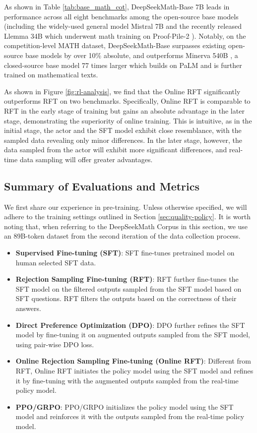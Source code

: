 As shown in Table \ref{tab:base_math_cot}, DeepSeekMath-Base 7B leads in performance across all eight benchmarks among the open-source base models (including the widely-used general model Mistral 7B \citep{mistral} and the recently released Llemma 34B \citep{llemma} which underwent math training on Proof-Pile-2 \citep{llemma}). Notably, on the competition-level MATH dataset, DeepSeekMath-Base surpasses existing open-source base models by over 10\% absolute, and outperforms Minerva 540B \citep{minerva}, a closed-source base model 77 times larger which builds on PaLM \citep{palm} and is further trained on mathematical texts.

As shown in Figure \ref{fig:rl-analysis},
we find that the Online RFT significantly outperforms RFT on two benchmarks. Specifically, Online RFT is comparable to RFT in the early stage of training but gains an absolute advantage in the later stage, demonstrating the superiority of online training. This is intuitive, as in the initial stage, the actor and the SFT model exhibit close resemblance, with the sampled data revealing only minor differences. In the later stage, however, the data sampled from the actor will exhibit more significant differences, and real-time data sampling will offer greater advantages.

\subsection{Summary of Evaluations and Metrics}

We first share our experience in pre-training. Unless otherwise specified, we will adhere to the training settings outlined in Section \ref{sec:quality-policy}. It is worth noting that, when referring to the DeepSeekMath Corpus in this section, we use an 89B-token dataset from the second iteration of the data collection process.

\begin{itemize}
    \item  \textbf{Supervised Fine-tuning (SFT)}: SFT fine-tunes pretrained model on human selected SFT data.
    \item \textbf{Rejection Sampling Fine-tuning (RFT)}: RFT further fine-tunes the SFT model on the filtered outputs sampled from the SFT model based on SFT questions. RFT filters the outputs based on the correctness of their answers.
    \item \textbf{Direct Preference Optimization (DPO)}: DPO further refines the SFT model by fine-tuning it on augmented outputs sampled from the SFT model, using pair-wise DPO loss.
    \item \textbf{Online Rejection Sampling Fine-tuning (Online RFT)}: Different from RFT, Online RFT initiates the policy model using the SFT model and refines it by fine-tuning with the augmented outputs sampled from the real-time policy model.
    \item \textbf{PPO/GRPO}: PPO/GRPO initializes the policy model using the SFT model and reinforces it with the outputs sampled from the real-time policy model.
\end{itemize}


